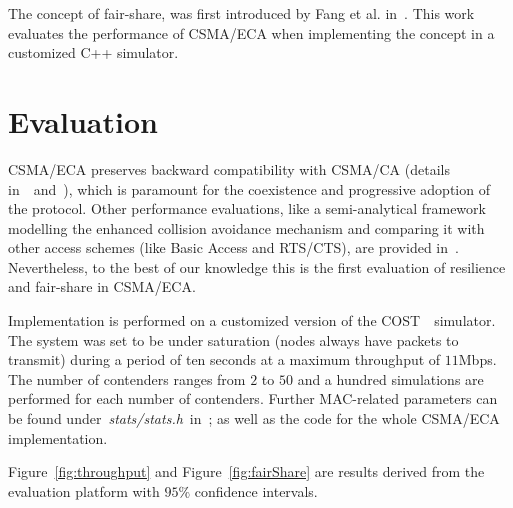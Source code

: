 The concept of fair-share, was first introduced by Fang et al. in~\cite{L_MAC2}. This work evaluates the performance of CSMA/ECA when implementing the concept in a customized C++ simulator.


\section{Evaluation}
CSMA/ECA preserves backward compatibility with CSMA/CA (details in~\cite{CSMA_ECA}~and~\cite{HE}), which is paramount for the coexistence and progressive adoption of the protocol. Other performance evaluations, like a semi-analytical framework modelling the enhanced collision avoidance mechanism and comparing it with other access schemes (like Basic Access and RTS/CTS), are provided in~\cite{E2CA_performance}. Nevertheless, to the best of our knowledge this is the first evaluation of resilience and fair-share in CSMA/ECA.

Implementation is performed on a customized version of the COST~\cite{COST}~simulator. The system was set to be under saturation (nodes always have packets to transmit) during a period of ten seconds at a maximum throughput of $11$Mbps. The number of contenders ranges from $2$ to $50$ and a hundred simulations are performed for each number of contenders. Further MAC-related parameters can be found under~\emph{stats/stats.h}~in~\cite{sim:parameters}; as well as the code for the whole CSMA/ECA implementation.

Figure~\ref{fig:throughput} and Figure~\ref{fig:fairShare} are results derived from the evaluation platform with $95\%$ confidence intervals.